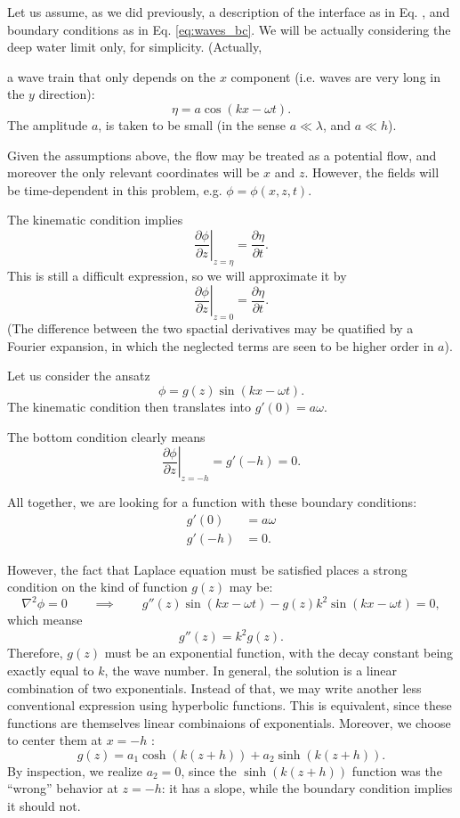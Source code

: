   Let us assume, as we did previously, a description of the interface as
in Eq. \label{eq:waves_elevation}, and boundary conditions as in
Eq. \ref{eq:waves_bc}. We will be actually considering the deep water
limit only, for simplicity. (Actually,


a wave train that only depends on the $x$ component
(i.e. waves are very long in the $y$ direction):
\[
\eta = a \cos(kx -\omega t) .
\]
The amplitude $a$, is taken to be small (in the sense $a\ll \lambda$,
and $a\ll h$).

Given the assumptions above, the flow may be treated as a potential
flow, and moreover the only relevant coordinates will be $x$ and
$z$. However, the fields will be time-dependent in this problem,
e.g. $\phi=\phi(x,z,t)$.


The kinematic condition  implies
\[
\left. \frac{\partial \phi}{\partial z}\right|_{z=\eta} =
\frac{\partial \eta}{\partial t} .
\]
This is still a difficult expression, so we will approximate it by
\[
\left. \frac{\partial \phi}{\partial z}\right|_{z=0} =
\frac{\partial \eta}{\partial t} .
\]
(The difference between the two spactial derivatives may be quatified
by a Fourier expansion, in which the neglected terms are seen to be
higher order in $a$).

Let us consider the ansatz
\[
\phi = g(z) \sin(kx -\omega t ) .
\]
The kinematic condition then translates into $g'(0)=a\omega$.

The bottom condition clearly means
\[
\left. \frac{\partial \phi}{\partial z}\right|_{z= -h } = g'(-h)= 0 .
\]


All together, we are looking for a function with these boundary
conditions:
\begin{align}
  g'(0) &=  a \omega \\
  g'(-h) &= 0 .
\end{align}

However, the fact that Laplace equation must be satisfied places a
strong condition on the kind of function $g(z)$ may be:
\[
\nabla^2 \phi = 0 \qquad \implies \qquad
g''(z)  \sin(kx -\omega t ) - g(z)  k^2 \sin(kx -\omega t ) = 0 ,
\]
which meanse
\[
g''(z)  = k^2 g(z) .
\]
Therefore, $g(z)$ must be an exponential function, with the decay
constant being exactly equal to $k$, the wave number. In general, the
solution is a linear combination of two exponentials. Instead of that,
we may write another less conventional expression using hyperbolic
functions. This is equivalent, since these functions are themselves
linear combinaions of exponentials. Moreover, we choose to center them
at $x=-h$ :
\[
g(z)  = a_1 \cosh(k(z+h)) + a_2 \sinh(k(z+h)) .
\]
By inspection, we realize $a_2=0$, since the $\sinh(k(z+h))$ function
was the ``wrong'' behavior at $z=-h$: it has a slope, while the
boundary condition implies it should not.

